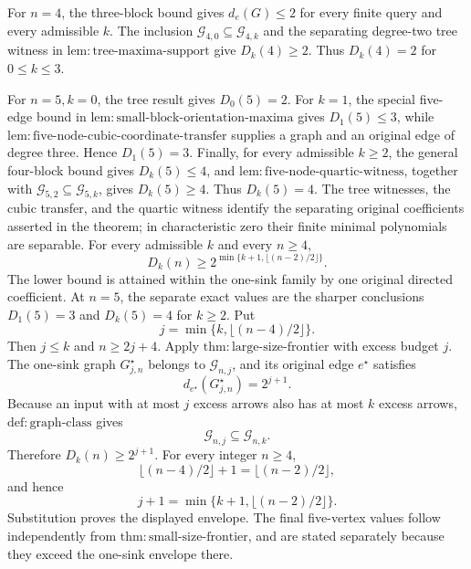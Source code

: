 For \(n=4\), the three-block bound gives \(d_e(G)\leq2\) for every finite query and every admissible \(k\). The inclusion \(\mathcal G_{4,0}\subseteq\mathcal G_{4,k}\) and the separating degree-two tree witness in \(\mathrm{lem:tree\mbox{-}maxima\mbox{-}support}\) give \(D_k(4)\geq2\). Thus \(D_k(4)=2\) for \(0\leq k\leq3\).

For \(n=5,k=0\), the tree result gives \(D_0(5)=2\). For \(k=1\), the special five-edge bound in \(\mathrm{lem:small\mbox{-}block\mbox{-}orientation\mbox{-}maxima}\) gives \(D_1(5)\leq3\), while \(\mathrm{lem:five\mbox{-}node\mbox{-}cubic\mbox{-}coordinate\mbox{-}transfer}\) supplies a graph and an original edge of degree three. Hence \(D_1(5)=3\). Finally, for every admissible \(k\geq2\), the general four-block bound gives \(D_k(5)\leq4\), and \(\mathrm{lem:five\mbox{-}node\mbox{-}quartic\mbox{-}witness}\), together with \(\mathcal G_{5,2}\subseteq\mathcal G_{5,k}\), gives \(D_k(5)\geq4\). Thus \(D_k(5)=4\). The tree witnesses, the cubic transfer, and the quartic witness identify the separating original coefficients asserted in the theorem; in characteristic zero their finite minimal polynomials are separable.
For every admissible \(k\) and every \(n\geq4\),
\[
 D_k(n)\geq
 2^{\min\{k+1,\lfloor(n-2)/2\rfloor\}}.
\]
The lower bound is attained within the one-sink family by one original directed coefficient. At \(n=5\), the separate exact values are the sharper conclusions \(D_1(5)=3\) and \(D_k(5)=4\) for \(k\geq2\).
Put
\[
 j=\min\{k,\lfloor(n-4)/2\rfloor\}.
\]
Then \(j\leq k\) and \(n\geq2j+4\). Apply \(\mathrm{thm:large\mbox{-}size\mbox{-}frontier}\) with excess budget \(j\). The one-sink graph \(G^{\star}_{j,n}\) belongs to \(\mathcal G_{n,j}\), and its original edge \(e^{\star}\) satisfies
\[
 d_{e^{\star}}(G^{\star}_{j,n})=2^{j+1}.
\]
Because an input with at most \(j\) excess arrows also has at most \(k\) excess arrows, \(\mathrm{def:graph\mbox{-}class}\) gives
\[
 \mathcal G_{n,j}\subseteq\mathcal G_{n,k}.
\]
Therefore \(D_k(n)\geq2^{j+1}\). For every integer \(n\geq4\),
\[
 \lfloor(n-4)/2\rfloor+1=\lfloor(n-2)/2\rfloor,
\]
and hence
\[
 j+1=\min\{k+1,\lfloor(n-2)/2\rfloor\}.
\]
Substitution proves the displayed envelope. The final five-vertex values follow independently from \(\mathrm{thm:small\mbox{-}size\mbox{-}frontier}\), and are stated separately because they exceed the one-sink envelope there.

